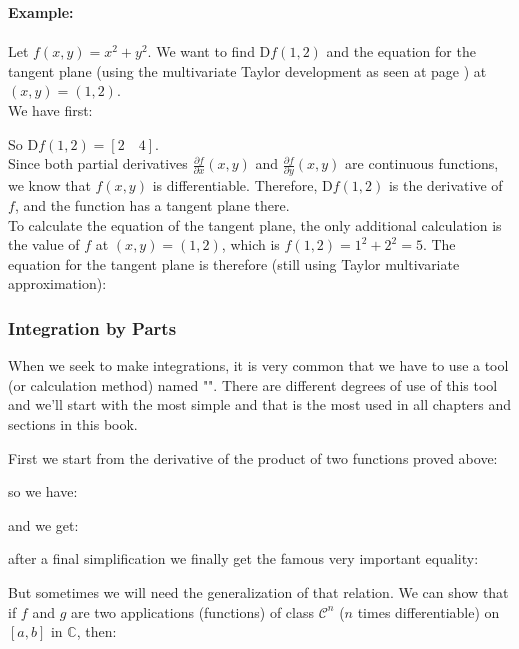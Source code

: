 	\begin{tcolorbox}[colframe=black,colback=white,sharp corners]
	\textbf{{\Large {}}Example:}\\\\
	Let $f(x, y)=x^{2}+y^{2}$. We want to find $\mathrm{D} f(1,2)$ and the equation for the tangent plane (using the multivariate Taylor development as seen at page \pageref{multivariate taylor series}) at $(x, y)=(1,2)$.\\
		
	We have first:
	
	So $\mathrm{D} f(1,2)=\left[2\quad 4\right]$.\\
	
	Since both partial derivatives $\frac{\partial f}{\partial x}(x, y)$ and $\frac{\partial f}{\partial y}(x, y)$ are continuous functions, we know that $f(x, y)$ is differentiable. Therefore, $\mathrm{D}f(1,2)$ is the derivative of $f$, and the function has a tangent plane there.\\
	
	To calculate the equation of the tangent plane, the only additional calculation is the value of $f$ at $(x, y)=(1,2)$, which is $f(1,2)=1^{2}+2^{2}=5$. The equation for the tangent plane is therefore (still using Taylor multivariate approximation):
	
	\end{tcolorbox}

	\pagebreak
	\subsubsection{Integration by Parts}\label{integration by parts}
	When we seek to make integrations, it is very common that we have to use a tool (or calculation method) named "". There are different degrees of use of this tool and we'll start with the most simple and that is the most used in all chapters and sections in this book.
	
	First we start from the derivative of the product of two functions proved above:
	
	
	so we have:
	
	and we get:
	
	after a final simplification we finally get the famous very important equality:
	
	But sometimes we will need the generalization of that relation. We can show that if $f$ and $g$ are two applications (functions) of class $\mathcal{C}^n$ ($n$ times differentiable) on $[a, b]$ in $\mathbb{C}$, then:
	

